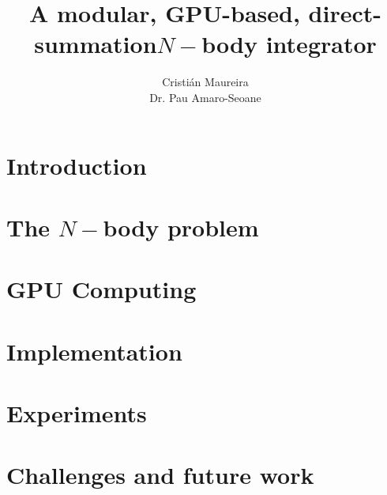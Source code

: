 \documentclass{beamer}
\author[C. Maureira]
       {\Large Cristián Maureira
       \\\normalsize Dr. Pau Amaro-Seoane
       }
\title[GPU {\nbody} integrator]
      {A modular, GPU-based, direct-summation\newline $N-$body integrator}
\institute[AEI]{Albert Einstein Institute}
\begin{document}
%

\begin{frame}[t,plain]
    \titlepage
\end{frame}



\section{Introduction}


\section{The $N-$body problem}


\section{GPU Computing}


\section{Implementation}


\section{Experiments}


\section{Challenges and future work}


%

\begin{frame}[allowframebreaks]
\footnotesize

\end{frame}

\begin{frame}[t,plain]
\titlepage
\end{frame}
\end{document}
